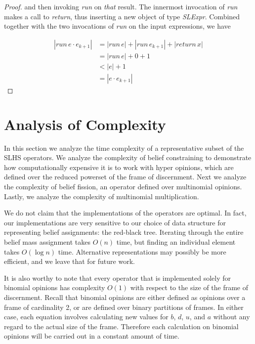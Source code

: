 \documentclass[thesis.tex]{subfiles}
\begin{document}
\begin{proof}
  and then invoking \emph{run} on \emph{that} result. The innermost invocation of \emph{run} makes a call
  to \emph{return}, thus inserting a new object of type \emph{SLExpr}. Combined together with the two
  invocations of \emph{run} on the input expressions, we have

  \begin{equation*}
  \begin{split}
    |run\,e \cdot e_{k + 1}|& = |run\,e| + |run\,e_{k+1}| + |return\,x| \\
                     & = |run\,e| + 0 + 1 \\
                     & < |e| + 1 \\
                     & = |e \cdot e_{k+1}|
  \end{split}
  \end{equation*}

\end{proof}



%
%


\section{Analysis of Complexity}
\label{sec:complexity}

In this section we analyze the time complexity of a representative subset of the SLHS operators. We
analyze the complexity of belief constraining to demonstrate how computationally expensive it is to
work with hyper opinions, which are defined over the reduced powerset of the frame of discernment.
Next we analyze the complexity of belief fission, an operator defined over multinomial opinions.
Lastly, we analyze the complexity of multinomial multiplication.

We do not claim that the implementations of the operators are optimal. In fact, our implementations
are very sensitive to our choice of data structure for representing belief assignments: the red-black
tree. Iterating through the entire belief mass assignment takes $O (n)$ time, but finding an individual
element takes $O (\log n)$ time. Alternative representations may possibly be more efficient, and we leave
that for future work.

It is also worthy to note that every operator that is implemented solely for binomial opinions has
complexity $O(1)$ with respect to the size of the frame of discernment. Recall that binomial opinions
are either defined as opinions over a frame of cardinality 2, or are defined over binary partitions of
frames. In either case, each equation involves calculating new values for $b$, $d$, $u$, and $a$ without
any regard to the actual size of the frame. Therefore each calculation on binomial opinions will be
carried out in a constant amount of time.
\end{document}
